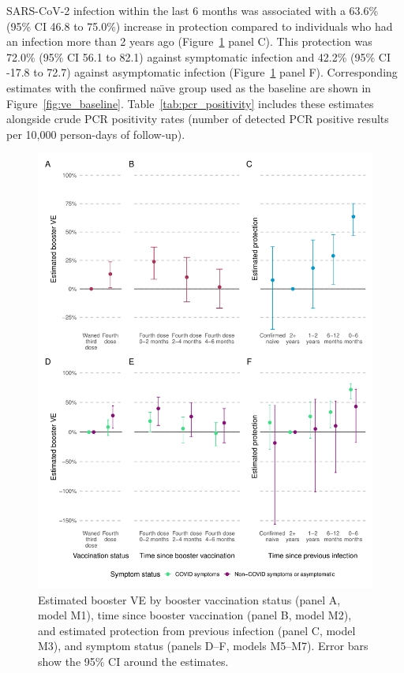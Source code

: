 SARS-CoV-2 infection within the last 6 months was associated with a 63.6\% (95\% CI 46.8 to 75.0\%) increase in protection compared to individuals who had an infection more than 2 years ago (Figure~\ref{fig:ve_long} panel C). This protection was 72.0\% (95\% CI 56.1 to 82.1) against symptomatic infection and 42.2\% (95\% CI -17.8 to 72.7) against asymptomatic infection (Figure~\ref{fig:ve_long} panel F). Corresponding estimates with the confirmed na\"{\i}ve group used as the baseline are shown in Figure~\ref{fig:ve_baseline}. Table~\ref{tab:pcr_positivity} includes these estimates alongside crude PCR positivity rates (number of detected PCR positive results per 10,000 person-days of follow-up).

\begin{figure}[htbp!]
    \centering
    \includegraphics[width=\textwidth]{ve_long.pdf}
    \caption[Estimated booster VE by booster vaccination status, time since booster vaccination, and estimated protection from previous infection]{Estimated booster VE by booster vaccination status (panel A, model M1), time since booster vaccination (panel B, model M2), and estimated protection from previous infection (panel C, model M3), and symptom status (panels D--F, models M5--M7). Error bars show the 95\% CI around the estimates.}\label{fig:ve_long}
\end{figure}

